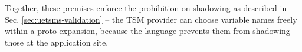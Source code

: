 Together, these premises enforce the prohibition on shadowing as described in Sec. \ref{sec:uetsms-validation} -- the TSM provider can choose variable names freely within a proto-expansion, because the language prevents them from shadowing those at the application site.
